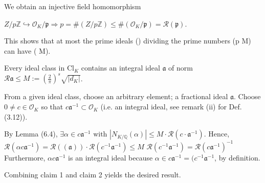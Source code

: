 We obtain an injective field homomorphism

\(Z/p\mathbb{Z} \hookrightarrow \mathcal{O}_K/\mathfrak{p} \Longrightarrow p = \#(Z/p\mathbb{Z}) \le \#(\mathcal{O}_K/\mathfrak{p}) = \mathcal{R}(\mathfrak{p})\).

This shows that at most the prime ideals () dividing the prime numbers (p \leq M) can have (  \leq M).

Every ideal class in \(\text{Cl}_K\) contains an integral ideal \(\mathfrak{a}\) of norm \(\mathcal{R} \mathfrak{a} \leq M := (\frac{2}{\pi})^s \sqrt{|d_K|}\).

From a given ideal class, choose an arbitrary element; a fractional ideal \(\mathfrak{a}\). Choose \(0 \neq c \in \mathcal{O}_K\) so that 
\(c \mathfrak{a}^{-1} \subset \mathcal{O}_K\) (i.e. an integral ideal, see remark (ii) for Def. (3.12)).

By Lemma (6.4), \(\exists \alpha \in c\mathfrak{a}^{-1} \text{ with } |N_{K/\mathbb{Q}}(\alpha)| \le M \cdot \mathcal{R}(c \cdot \mathfrak{a}^{-1})\). 
Hence,
\(\mathcal{R}(\alpha c \mathfrak{a}^{-1}) = \mathcal{R}((\mathfrak{a})) \cdot \mathcal{R}(c^{-1}\mathfrak{a}^{-1}) \leq M\) 
\( \mathcal{R}(c^{-1}\mathfrak{a}^{-1}) = \mathcal{R}(c\mathfrak{a}^{-1})^{-1}\)
Furthermore, \(\alpha c \mathfrak{a}^{-1}\) is an integral ideal because \(\alpha \in c \mathfrak{a}^{-1} = (c^{-1} \mathfrak{a}^{-1}\), by definition.


Combining claim 1 and claim 2 yields the desired result.
